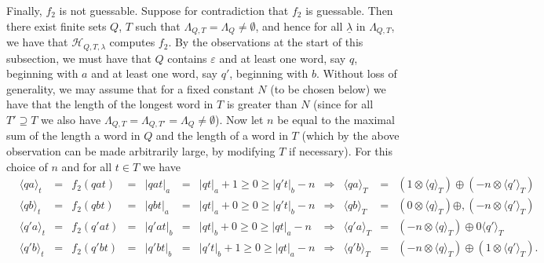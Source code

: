 \documentclass{lmcs}
\numberwithin{theorem}{section}
\begin{document}
		Finally, $f_2$ is not guessable. Suppose for contradiction that $f_2$ is guessable. Then there exist finite sets $Q$, $T$ such that $\Lambda_{Q, T} = \Lambda_Q \neq \emptyset$, and hence for all $\underline{\lambda}$ in $\Lambda_{Q,T}$, we have that $\mathcal{H}_{Q,T,\lambda}$ computes $f_2$. By the observations at the start of this subsection, we must have that $Q$ contains $\varepsilon$ and at least one word, say $q$, beginning with $a$ and at least one word, say $q'$,  beginning with $b$. Without loss of generality, we may assume that for a fixed constant $N$ (to be chosen below) we have that the length of the longest word in $T$ is greater than $N$ (since for all $T' \supseteq T$ we also have $\Lambda_{Q, T} = \Lambda_{Q, T'}= \Lambda_Q \neq \emptyset$). Now let $n$ be equal to the maximal sum of the length a word in $Q$ and the length of a word in $T$ (which by the above observation can be made arbitrarily large, by modifying $T$ if necessary). For this choice of $n$ and for all $t \in T$ we have
		\begin{align*} %
		&\langle qa \rangle_t \!\!\!&=& f_2(qat) \!\!\!&=& |qat|_a \!\!\!&=& |qt|_a +1 \geq 0 \geq |q't|_b - n \!\!\!&\Rightarrow& \langle qa \rangle_T  \!\!\!&=& (1 \otimes \langle q \rangle_T) \oplus (-n \otimes \langle q' \rangle_T)\\
		&\langle qb \rangle_t \!\!\!&=& f_2(qbt) \!\!\!&=& |qbt|_a \!\!\!&=& |qt|_a + 0  \geq 0 \geq |q't|_b - n \!\!\!&\Rightarrow& \langle qb \rangle_T \!\!\!&=& (0 \otimes \langle q \rangle_T) \oplus, (-n \otimes \langle q' \rangle_T)\\
		&\langle q'a \rangle_t \!\!\!&=& f_2(q'at) \!\!\!&=& |q'at|_b \!\!\!&=& |qt|_b +0 \geq 0 \geq |qt|_a - n \!\!\!&\Rightarrow& \langle q'a \rangle_T \!\!\!&=& (-n \otimes \langle q \rangle_T) \oplus 0 \langle q' \rangle_T\\
		&\langle q'b \rangle_t \!\!\!&=& f_2(q'bt) \!\!\!&=& |q'bt|_b \!\!\!&=& |q't|_b +1 \geq 0 \geq |qt|_a-n \!\!\!&\Rightarrow& \langle q'b \rangle_T \!\!\!&=& (-n \otimes \langle q \rangle_T) \oplus (1 \otimes\langle q' \rangle_T).
		\end{align*}
\end{document}
